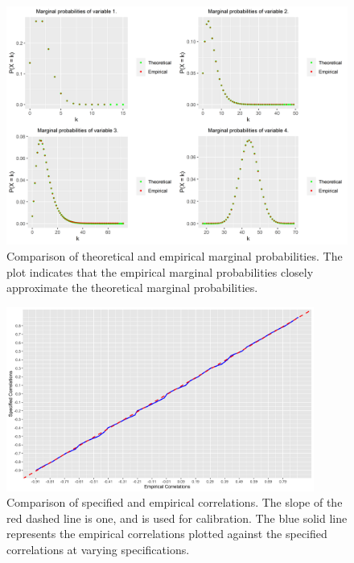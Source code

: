\begin{center}
    \begin{figure}[H]
        \centering
        \includegraphics[width = \textwidth,height = 0.7\textwidth,keepaspectratio]{fig3_marginal_PMFs.png}
        \caption{Comparison of theoretical and empirical marginal probabilities. The plot indicates that the empirical marginal probabilities closely approximate the theoretical marginal probabilities.}
        \label{fig:marginal}
    \end{figure}
\end{center}

\begin{center}
    \begin{figure}[H]
        \centering
        \includegraphics[width = 0.9\textwidth,height=0.7\textwidth,keepaspectratio]{fig4_samp100_iter_50_350dpi.png}
        \caption{Comparison of specified and empirical correlations. The slope of the red dashed line is one, and is used for calibration. The blue solid line represents the empirical correlations plotted against the specified correlations at varying specifications.}
        \label{fig:4}
    \end{figure}
\end{center}

